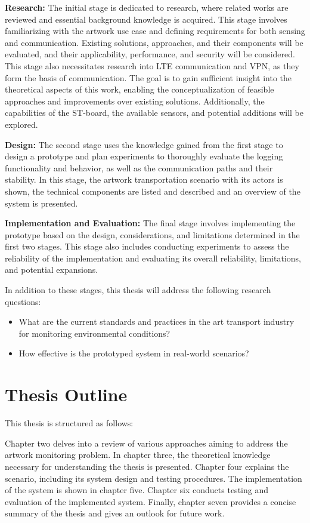 \textbf{Research:}
The initial stage is dedicated to research, where related works are reviewed and essential background knowledge is acquired. This stage involves familiarizing with the artwork use case and defining requirements for both sensing and communication. Existing solutions, approaches, and their components will be evaluated, and their applicability, performance, and security will be considered. This stage also necessitates research into LTE communication and VPN, as they form the basis of communication. The goal is to gain sufficient insight into the theoretical aspects of this work, enabling the conceptualization of feasible approaches and improvements over existing solutions. Additionally, the capabilities of the ST-board, the available sensors, and potential additions will be explored.

\textbf{Design:}
The second stage uses the knowledge gained from the first stage to design a prototype and plan experiments to thoroughly evaluate the logging functionality and behavior, as well as the communication paths and their stability. In this stage, the artwork transportation scenario with its actors is shown, the technical components are listed and described and an overview of the system is presented.

\textbf{Implementation and Evaluation:}
The final stage involves implementing the prototype based on the design, considerations, and limitations determined in the first two stages. This stage also includes conducting experiments to assess the reliability of the implementation and evaluating its overall reliability, limitations, and potential expansions.

In addition to these stages, this thesis will address the following research questions:

\begin{itemize}
    \item What are the current standards and practices in the art transport industry for monitoring environmental conditions?
    \item How effective is the prototyped system in real-world scenarios?
\end{itemize}

\section{Thesis Outline}
This thesis is structured as follows:

Chapter two delves into a review of various approaches aiming to address the artwork monitoring problem.
In chapter three, the theoretical knowledge necessary for understanding the thesis is presented.
Chapter four explains the scenario, including its system design and testing procedures.
The implementation of the system is shown in chapter five.
Chapter six conducts testing and evaluation of the implemented system.
Finally, chapter seven provides a concise summary of the thesis and gives an outlook for future work.
